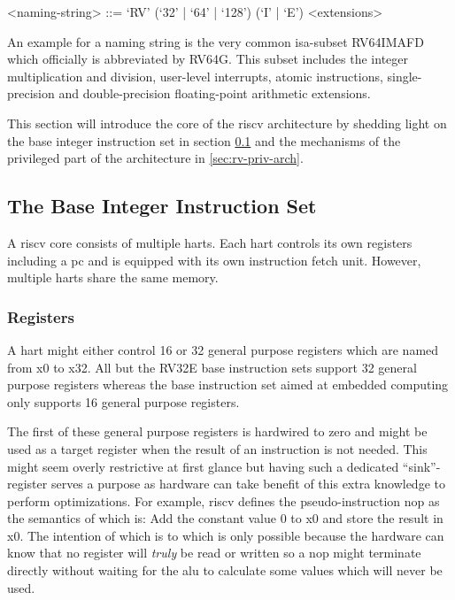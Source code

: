\begin{grammar}
    <naming-string> ::= `RV' (`32' | `64' | `128') (`I' | `E') <extensions>
\end{grammar}

An example for a naming string is the very common \gls{isa}-subset RV64IMAFD which officially is abbreviated by RV64G.
This subset includes the integer multiplication and division, user-level interrupts, atomic instructions, single-precision and double-precision floating-point arithmetic extensions.

This section will introduce the core of the \gls{riscv} architecture by shedding light on the base integer instruction set in section \ref{sec:rv-base-int-isa} and the mechanisms of the privileged part of the architecture in \ref{sec:rv-priv-arch}.

\subsection{The Base Integer Instruction Set}
\label{sec:rv-base-int-isa}

A \gls{riscv} core consists of multiple \glspl{hart}.
Each \gls{hart} controls its own registers including a \gls{pc} and is equipped with its own instruction fetch unit.
However, multiple \glspl{hart} share the same memory.

\subsubsection{Registers}
A \gls{hart} might either control 16 or 32 general purpose registers which are named from x0 to x32.
All but the RV32E base instruction sets support 32 general purpose registers whereas the base instruction set aimed at embedded computing only supports 16 general purpose registers.

The first of these general purpose registers is hardwired to zero and might be used as a target register when the result of an instruction is not needed.
This might seem overly restrictive at first glance but having such a dedicated \enquote{sink}-register serves a purpose as hardware can take benefit of this extra knowledge to perform optimizations.
For example, \gls{riscv} defines the pseudo-instruction \gls{nop} as  the semantics of which is: Add the constant value 0 to x0 and store the result in x0.
The intention of which is to  which is only possible because the hardware can know that no register will \textit{truly} be read or written so a \gls{nop} might terminate directly without waiting for the \gls{alu} to calculate some values which will never be used.

